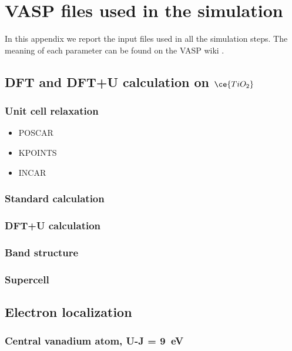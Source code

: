 \chapter{VASP files used in the simulation}
In this appendix we report the input files used in all the simulation steps. The meaning of each parameter can be found on the VASP wiki \cite{zotero-172}.

\section{DFT and DFT+U calculation on $\ce{TiO_2}$}
\subsection{Unit cell relaxation} \label{app:simple_relaxation}
\begin{itemize}
    \item POSCAR
          
    \item KPOINTS
          
    \item       INCAR
          
\end{itemize}

\subsection{Standard calculation} \label{app:standard_calculation}
\subsection{DFT+U calculation} \label{app:DFT+U_calculation}
\subsection{Band structure} \label{app:simle_non_self}
\subsection{Supercell} \label{app:supercell}

\section{Electron localization}
\subsection{Central vanadium atom, U-J = \SI{9}{eV}} \label{app:localization}
